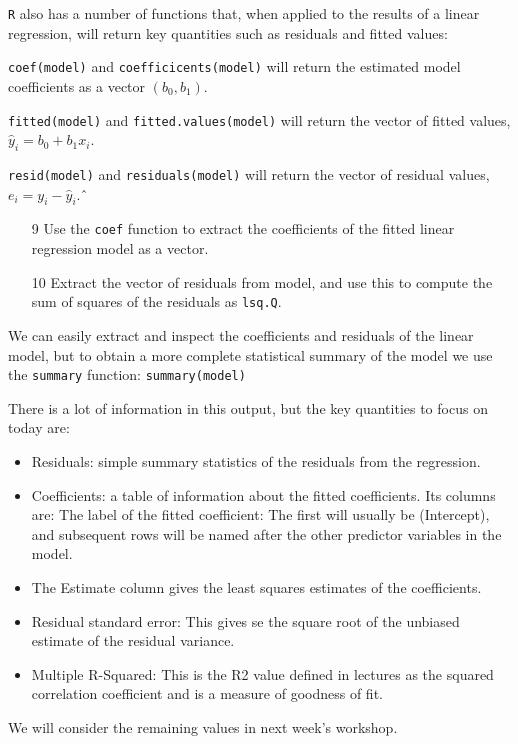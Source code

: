 \documentclass[11pt,a4paper]{article}
\begin{document}
\texttt{R} also has a number of functions that, when applied to the results of a linear regression, will return key quantities such as residuals and fitted values:

\vspace{0.35cm}

\texttt{coef(model)} and \texttt{coefficicents(model)} will return the estimated model coefficients as a vector $(b_0,b_1)$.

\texttt{fitted(model)} and \texttt{fitted.values(model)} will return the vector of fitted values, $\hat{y}_i=b_0+b_1x_i$.

\texttt{resid(model)} and \texttt{residuals(model)} will return the vector of residual values, $e_i=y_i−\hat{y}_i$.ˆ

\begin{enumerate}
    \item[9] Use the \texttt{coef} function to extract the coefficients of the fitted linear regression model as a vector.
\item[10]Extract the vector of residuals from model, and use this to compute the sum of squares of the residuals as \texttt{lsq.Q}.
\end{enumerate}   

We can easily extract and inspect the coefficients and residuals of the linear model, but to obtain a more complete statistical summary of the model we use the \texttt{summary} function: \texttt{summary(model)}

There is a lot of information in this output, but the key quantities to focus on today are:
\begin{itemize}
\item Residuals: simple summary statistics of the residuals from the regression.
\item Coefficients: a table of information about the fitted coefficients. Its columns are:
The label of the fitted coefficient: The first will usually be (Intercept), and subsequent rows will be named after the other predictor variables in the model.
\item The Estimate column gives the least squares estimates of the coefficients.
\item Residual standard error: This gives se
 the square root of the unbiased estimate of the residual variance.
\item Multiple R-Squared: This is the R2
 value defined in lectures as the squared correlation coefficient and is a measure of goodness of fit.    
\end{itemize}
We will consider the remaining values in next week's workshop.
\end{document}
